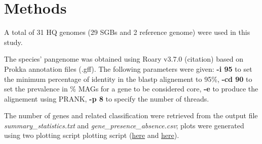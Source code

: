 \section*{Methods}



A total of 31 HQ genomes (29 SGBs and 2 reference genome) were used in this study. 

\nocite{Tange2011a}



The species' pangenome was obtained using Roary v3.7.0 (citation) based on Prokka annotation files (.gff). 
The following parameters were given: \textbf{-i 95} to set the minimum percentage of identity
in the blastp alignement to 95\%, \textbf{-cd 90} to set the prevalence in \% MAGs for a gene
to be considered core, \textbf{-e} to produce the alignement using PRANK, \textbf{-p 8} to
specify the number of threads. 

The number of genes and related classification were retrieved from the output file
\textit{summary\_statistics.txt} and \textit{gene\_presence\_absence.csv}; plots were generated using two
plotting script plotting script (\href{https://github.com/sanger-pathogens/Roary/blob/master/bin/create_pan_genome_plots.R}{here}
and \href{https://github.com/sanger-pathogens/Roary/blob/master/contrib/roary_plots/roary_plots.py}{here}).






